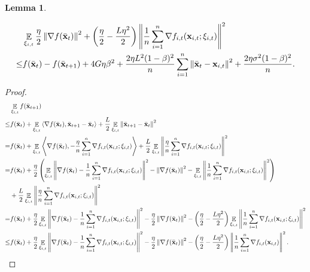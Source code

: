 \documentclass{article}
\newtheorem{Lemma}{\bf{Lemma}}
\begin{document}
\begin{Lemma}
\label{lemma_gradient_norm_bound}

\nonumber
\begin{align}
\nonumber
& \mathop{\mathbb{E}}_{\xi_{i,t}}\frac{\eta}{2}\left\lVert\nabla f(\bar{{\bf x}}_t)\right\rVert^2 + \left( \frac{\eta}{2} - \frac{L\eta^2}{2} \right)\left\lVert\frac{1}{n}\sum_{i=1}^n \nabla f_{i,t}({\bf x}_{i,t};\xi_{i,t})\right\rVert^2 \\ \nonumber 
\le & f(\bar{{\bf x}}_t) - f(\bar{{\bf x}}_{t+1}) + 4G\eta\beta^2 +  \frac{2\eta L^2(1-\beta)^2}{n}\sum_{i=1}^n\left\lVert\bar{{\bf x}}_t - {\bf x}_{i,t} \right\rVert^2 + \frac{2\eta\sigma^2(1-\beta)^2}{n}.
\end{align}
\end{Lemma}
\begin{proof}

\begin{align}
\nonumber
& \mathop{\mathbb{E}}_{\xi_{i,t}}f(\bar{{\bf x}}_{t+1}) \\ \nonumber
\le & f(\bar{{\bf x}}_t) + \mathop{\mathbb{E}}_{\xi_{i,t}}\left\langle\nabla f(\bar{{\bf x}}_t), \bar{{\bf x}}_{t+1} - \bar{{\bf x}}_t \right\rangle + \frac{L}{2}\mathop{\mathbb{E}}_{\xi_{i,t}}\left\lVert\bar{{\bf x}}_{t+1} - \bar{{\bf x}}_t\right\rVert^2 \\ \nonumber
= & f(\bar{{\bf x}}_t) + \mathop{\mathbb{E}}_{\xi_{i,t}}\left\langle\nabla f(\bar{{\bf x}}_t), -\frac{\eta}{n}\sum_{i=1}^n \nabla f_{i,t}({\bf x}_{i,t};\xi_{i,t}) \right\rangle + \frac{L}{2} \mathop{\mathbb{E}}_{\xi_{i,t}}\left\lVert\frac{\eta}{n}\sum_{i=1}^n \nabla f_{i,t}({\bf x}_{i,t};\xi_{i,t})\right\rVert^2 \\ \nonumber
= & f(\bar{{\bf x}}_t) + \frac{\eta}{2}\left( \mathop{\mathbb{E}}_{\xi_{i,t}}\left\lVert\nabla f(\bar{{\bf x}}_t) -\frac{1}{n}\sum_{i=1}^n \nabla f_{i,t}({\bf x}_{i,t};\xi_{i,t})\right\rVert^2 - \left\lVert\nabla f(\bar{{\bf x}}_t)\right\rVert^2 - \mathop{\mathbb{E}}_{\xi_{i,t}}\left\lVert\frac{1}{n}\sum_{i=1}^n \nabla f_{i,t}({\bf x}_{i,t};\xi_{i,t})\right\rVert^2  \right) \\ \nonumber 
& + \frac{L}{2}\mathop{\mathbb{E}}_{\xi_{i,t}}\left\lVert\frac{\eta}{n}\sum_{i=1}^n \nabla f_{i,t}({\bf x}_{i,t};\xi_{i,t})\right\rVert^2 \\ \nonumber
= & f(\bar{{\bf x}}_t) + \frac{\eta}{2}\mathop{\mathbb{E}}_{\xi_{i,t}}\left\lVert\nabla f(\bar{{\bf x}}_t) -\frac{1}{n}\sum_{i=1}^n \nabla f_{i,t}({\bf x}_{i,t};\xi_{i,t})\right\rVert^2 - \frac{\eta}{2}\left\lVert\nabla f(\bar{{\bf x}}_t)\right\rVert^2 - \left( \frac{\eta}{2} - \frac{L\eta^2}{2} \right)\mathop{\mathbb{E}}_{\xi_{i,t}}\left\lVert\frac{1}{n}\sum_{i=1}^n \nabla f_{i,t}({\bf x}_{i,t};\xi_{i,t})\right\rVert^2 \\ \label{equa_lemma_norm_gradient_square}
\le & f(\bar{{\bf x}}_t) + \frac{\eta}{2}\mathop{\mathbb{E}}_{\xi_{i,t}}\left\lVert\nabla f(\bar{{\bf x}}_t) -\frac{1}{n}\sum_{i=1}^n \nabla f_{i,t}({\bf x}_{i,t};\xi_{i,t})\right\rVert^2 - \frac{\eta}{2}\left\lVert\nabla f(\bar{{\bf x}}_t)\right\rVert^2 - \left( \frac{\eta}{2} - \frac{L\eta^2}{2} \right)\left\lVert\frac{1}{n}\sum_{i=1}^n \nabla f_{i,t}({\bf x}_{i,t})\right\rVert^2.
\end{align} 


\end{proof}
\end{document}
